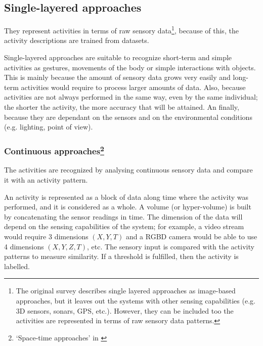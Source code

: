 \subsection{Single-layered approaches}
They represent activities in terms of raw sensory data\footnote{The original survey \citep{Aggarwal11_HumanActivity} describes single layered approaches as image-based approaches, but it leaves out the systems with other sensing capabilities (e.g. 3D sensors, sonars, GPS, etc.).
However, they can be included too the activities are represented in terms of raw sensory data patterns.}, because of this, the activity descriptions are trained from datasets.


Single-layered approaches are suitable to recognize short-term and simple activities as gestures, movements of the body or simple interactions with objects. 
This is mainly because the amount of sensory data grows very easily and long-term activities would require to process larger amounts of data. 
Also, because activities are not always performed in the same way, even by the same individual; the shorter the activity, the more accuracy that will be attained.
An finally, because they are dependant on the sensors and on the environmental conditions (e.g. lighting, point of view).


\subsubsection{Continuous approaches\footnote{`Space-time approaches' in \citep{Aggarwal11_HumanActivity}}} %

The activities are recognized by analysing continuous sensory data and compare it with an activity pattern.

An activity is represented as a block of data along time where the activity was performed, and it is considered as a whole.
A volume (or hyper-volume) is built by concatenating the sensor readings in time.
The dimension of the data will depend on the sensing capabilities of the system; for example, a video stream would require 3 dimensions $(X,Y,T)$ and a RGBD camera would be able to use 4 dimensions $(X,Y,Z,T)$, etc. %
The sensory input is compared with the activity patterns to measure similarity.
If a threshold is fulfilled, then the activity is labelled.

